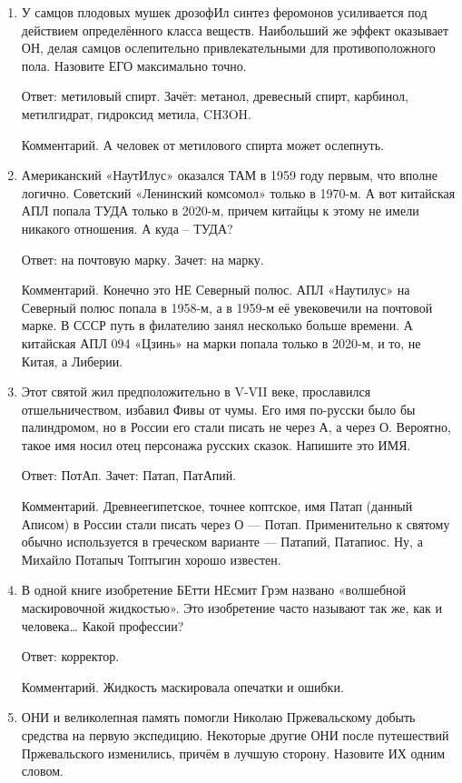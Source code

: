 \documentclass[oneside,final,14pt]{extreport}
\begin{document}
\begin{enumerate}
    \item У самцов плодовых мушек дрозофИл синтез феромонов усиливается под действием определённого класса веществ. Наибольший же эффект оказывает ОН, делая самцов ослепительно привлекательными для противоположного пола. Назовите ЕГО максимально точно.

    Ответ: метиловый спирт. Зачёт: метанол, древесный спирт, карбинол, метилгидрат, гидроксид метила, CH3OH.

    Комментарий. А человек от метилового спирта может ослепнуть.

    \item Американский «НаутИлус» оказался ТАМ в 1959 году первым, что вполне логично. Советский «Ленинский комсомол» только в 1970-м. А вот китайская АПЛ попала ТУДА только в 2020-м, причем китайцы к этому не имели никакого отношения. А куда – ТУДА?

    Ответ: на почтовую марку. Зачет: на марку.

    Комментарий. Конечно это НЕ Северный полюс. АПЛ «Наутилус» на Северный полюс попала в 1958-м, а в 1959-м её увековечили на почтовой марке. В СССР путь в филателию занял несколько больше времени. А китайская АПЛ 094 «Цзинь» на марки попала только в 2020-м, и то, не Китая, а Либерии.


    \item Этот святой жил предположительно в V-VII веке, прославился отшельничеством, избавил Фивы от чумы. Его имя по-русски было бы палиндромом, но в России его стали писать не через А, а через О. Вероятно, такое имя носил отец персонажа русских сказок. Напишите это ИМЯ.

    Ответ: ПотАп. Зачет: Патап, ПатАпий.

    Комментарий. Древнеегипетское, точнее коптское, имя Патап (данный Аписом) в России стали писать через О — Потап. Применительно к святому обычно используется в греческом варианте — Патапий, Патапиос. Ну, а Михайло Потапыч Топтыгин хорошо известен.

    \item В одной книге изобретение БЕтти НЕсмит Грэм названо «волшебной маскировочной жидкостью». Это изобретение часто называют так же, как и человека… Какой профессии?

    Ответ: корректор.

    Комментарий. Жидкость маскировала опечатки и ошибки.

    \item ОНИ и великолепная память помогли Николаю Пржевальскому добыть средства на первую экспедицию. Некоторые другие ОНИ после путешествий Пржевальского изменились, причём в лучшую сторону. Назовите ИХ одним словом.


\end{enumerate}
\end{document}
